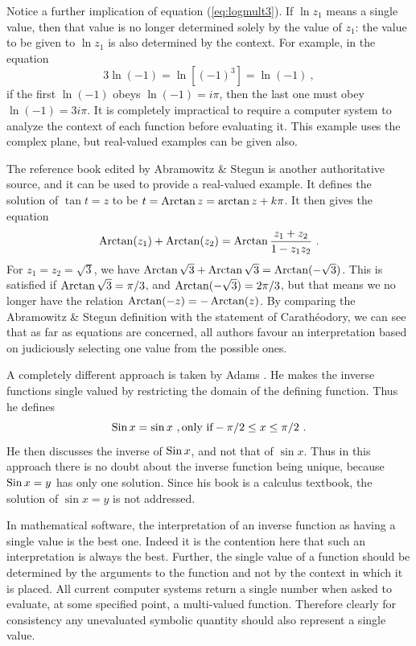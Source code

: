 \documentclass{article}
\newcommand{\Sin}{ \mathop {\rm Sin}\nolimits}
\newcommand{\Arctan}{ \mathop {\rm Arctan}\nolimits}
\begin{document}
Notice a further implication of equation (\ref{eq:logmult3}).
If $\ln z_1$ means a single value, then that value is no longer determined solely by the
value of $z_1$: the value to be given to $\ln z_1$ is also determined by the context.
For example, in the equation
\[ 3\ln(-1) = \ln[(-1)^3] =\ln(-1)\ ,\]
if the first $\ln(-1)$ obeys $\ln(-1)=i\pi$, then the last one must obey $\ln(-1)=3i\pi$.
It is completely impractical to require a computer system to analyze the context of
each function before evaluating it. This example uses the complex plane, but real-valued
examples can be given also.

The reference book edited by Abramowitz \& Stegun \cite[Chap 4]{AandS:1965} is another authoritative source,
and it can be used to provide a real-valued example.
It defines the solution of $\tan t=z$ to be $t=\Arctan z = \arctan z+k\pi$.
It then gives the equation
\[  \Arctan(z_1)+\Arctan(z_2) = \Arctan\frac{z_1+z_2}{1-z_1z_2} \ .\]
For $z_1=z_2=\sqrt3$, we have $\Arctan \sqrt3+\Arctan\sqrt3 =\Arctan(-\sqrt3)$.
This is satisfied if $\Arctan\sqrt3=\pi/3$, and $\Arctan(-\sqrt3)=2\pi/3$,
but that means we no longer have the relation $\Arctan(-z)=-\Arctan(z)$.
By comparing the Abramowitz \& Stegun definition with the statement of Carath\'eodory,
we can see that as far as equations are concerned, all authors favour an interpretation based on judiciously
selecting one value from the possible ones.

A completely different approach is taken by Adams \cite{Adams:1999:SVC}.
He makes the inverse functions single valued by restricting the domain of the
defining function. Thus he defines
\[   \Sin x = \sin x\ , \mbox{only if} -\pi/2 \le x \le \pi/2\ .      \]
He then discusses the inverse of $\Sin x$, and not that of $\sin x$.
Thus in this approach there is
no doubt about the inverse function being unique, because $\Sin x=y$ has only one solution.
Since his book is a calculus textbook, the solution of $\sin x=y$ is not addressed.

In mathematical software, the interpretation of an inverse function as having a
single value is the best one.
Indeed it is the contention here that such an interpretation is always the best.
Further, the single value of a function should be determined by the
arguments to the function and not by the context in which it is placed.
All current computer systems return a single number when asked to evaluate,
at some specified point, a multi-valued function.
Therefore clearly for consistency any unevaluated symbolic quantity should also
represent a single value.
\end{document}
